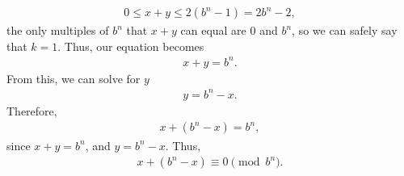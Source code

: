 \documentclass{report}
\begin{document}
\begin{itemize}
\begin{align*}
                0 \leq x + y \leq 2(b^{n}-1) = 2b^{n}-2
            ,\end{align*}
            the only multiples of $b^{n}$ that $x+y$ can equal are $0$ and $b^{n}$, so we can safely say that $k = 1$. Thus, our equation becomes
            \begin{align*}
                x+y =b^{n}
            .\end{align*}
            From this, we can solve for $y$
            \begin{align*}
                y = b^{n}-x
            .\end{align*}
            Therefore, 
            \begin{align*}
                x + (b^{n}-x) = b^{n}
            ,\end{align*}
            since $x + y = b^{n}$, and $y = b^{n}-x$. Thus,
            \begin{align*}
                x + (b^{n}-x) \equiv 0 \pmod{b^{n}}
            .\end{align*}


\end{itemize}
\end{document}
